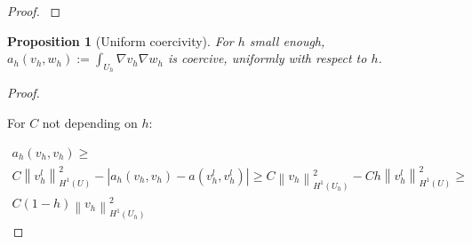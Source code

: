 \documentclass[english,a4paper,10pt,oneside]{scrbook}	%
\theoremstyle{break}
\newtheorem{prop}[equation]{Proposition}
\newenvironment{mproof}[1][\proofname]{%
  \begin{proof}[#1]$ $\par\nobreak\ignorespaces
}{%
  \end{proof}
}
\renewcommand*{\proofname}{Proof}
\theoremstyle{remark}
\newcommand{\ds}{\displaystyle}
\newcommand{\norm}[1]{\left\lVert#1\right\rVert}
\newcommand{\tr}{\text{tr}}
\newcommand{\id}{\text{Id}}
\newcommand{\te}{\theta}
\newcommand{\dive}{\text{div}}
\begin{document}
\begin{appendices}
\begin{mproof}
%
%
%
%
%
%
%
%
%
\end{mproof}

\begin{prop}[Uniform coercivity]
\label{thm:a_h_coercive}
For $h$ small enough, $a_h(v_h,w_h):=\ds \int_{U_h} \nabla v_h \nabla w_h$ is coercive, uniformly with respect to $h$.
\end{prop}
\begin{mproof}

For $C$ not depending on $h$:

\begin{align*}
a_h(v_h,v_h) \geq\\ C\norm{v_h^l}_{H^1(U)}^2 - |a_h(v_h,v_h) - a(v_h^l,v_h^l)|\geq C\norm{v_h}_{H^1(U_h)}^2 -C h \norm{v_h^l}_{H^1(U)}^2\geq \\C(1-h)\norm{v_h}_{H^1(U_h)}^2
\end{align*} 


\end{mproof}
\end{appendices}
\end{document}
